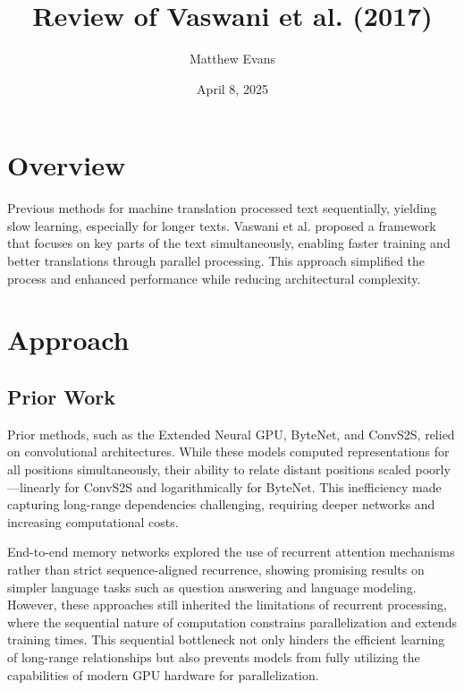 \documentclass[10pt]{article}
\title{
    Review of Vaswani et al. (2017) \\
}
\author{Matthew Evans}
\date{April 8, 2025}
\begin{document}
\maketitle

\section*{Overview}
Previous methods\cite{cho2014} for machine translation processed text sequentially, yielding slow learning, especially for longer texts. Vaswani et al.\cite{DBLP:journals/corr/VaswaniSPUJGKP17} proposed a framework that focuses on key parts of the text simultaneously, enabling faster training and better translations through parallel processing. This approach simplified the process and enhanced performance while reducing architectural complexity.

\section*{Approach}
\subsection*{Prior Work}
Prior methods, such as the Extended Neural GPU\cite{NIPS2016_fb8feff2}, ByteNet\cite{DBLP:journals/corr/KalchbrennerESO16}, and ConvS2S\cite{DBLP:journals/corr/GehringAGYD17}, relied on convolutional architectures. While these models computed representations for all positions simultaneously, their ability to relate distant positions scaled poorly—linearly for ConvS2S and logarithmically for ByteNet. This inefficiency made capturing long-range dependencies challenging, requiring deeper networks and increasing computational costs.

End-to-end memory networks\cite{NIPS2015_8fb21ee7} explored the use of recurrent attention mechanisms rather than strict sequence-aligned recurrence, showing promising results on simpler language tasks such as question answering and language modeling. However, these approaches still inherited the limitations of recurrent processing, where the sequential nature of computation constrains parallelization and extends training times. This sequential bottleneck not only hinders the efficient learning of long-range relationships but also prevents models from fully utilizing the capabilities of modern GPU hardware for parallelization.
\end{document}
